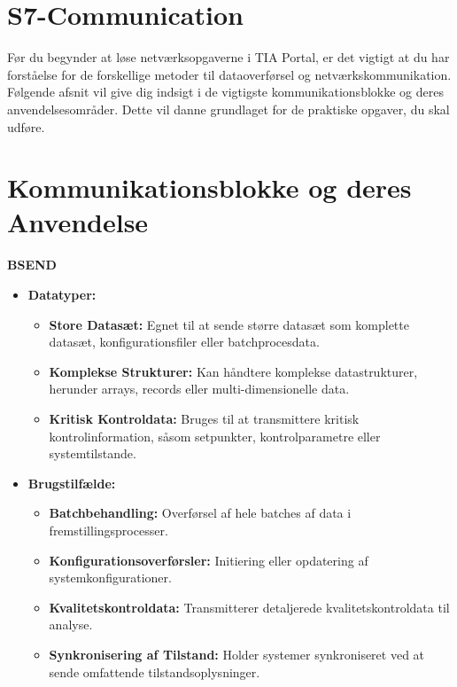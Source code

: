 \section{S7-Communication}
Før du begynder at løse netværksopgaverne i TIA Portal, er det vigtigt at du har forståelse for de forskellige metoder til dataoverførsel og netværkskommunikation. Følgende afsnit vil give dig indsigt i de vigtigste kommunikationsblokke og deres anvendelsesområder. Dette vil danne grundlaget for de praktiske opgaver, du skal udføre.

\section{Kommunikationsblokke og deres Anvendelse}
\textbf{BSEND}
\begin{itemize}
	\item \textbf{Datatyper:}
	\begin{itemize}
		\item \textbf{Store Datasæt:} Egnet til at sende større datasæt som komplette datasæt, konfigurationsfiler eller batchprocesdata.
		\item \textbf{Komplekse Strukturer:} Kan håndtere komplekse datastrukturer, herunder arrays, records eller multi-dimensionelle data.
		\item \textbf{Kritisk Kontroldata:} Bruges til at transmittere kritisk kontrolinformation, såsom setpunkter, kontrolparametre eller systemtilstande.
	\end{itemize}
	\item \textbf{Brugstilfælde:}
	\begin{itemize}
		\item \textbf{Batchbehandling:} Overførsel af hele batches af data i fremstillingsprocesser.
		\item \textbf{Konfigurationsoverførsler:} Initiering eller opdatering af systemkonfigurationer.
		\item \textbf{Kvalitetskontroldata:} Transmitterer detaljerede kvalitetskontroldata til analyse.
		\item \textbf{Synkronisering af Tilstand:} Holder systemer synkroniseret ved at sende omfattende tilstandsoplysninger.
	\end{itemize}
\end{itemize}

